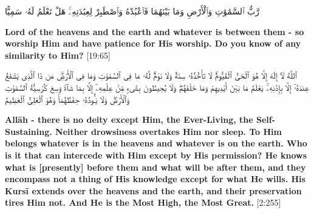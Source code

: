 \begin{center}
    \begin{RLtext}
        رَّبُّ ٱلسَّمَٰوَٰتِ وَٱلْأَرْضِ وَمَا بَيْنَهُمَا فَٱعْبُدْهُ وَٱصْطَبِرْ لِعِبَٰدَتِهِۦۚ هَلْ تَعْلَمُ لَهُۥ سَمِيًّا 
    \end{RLtext}
    \textbf{Lord of the heavens and the earth and whatever is between them - so worship Him and have patience for His worship. Do you know of any similarity to Him?} [19:65]
\end{center}
\begin{center}
    \begin{RLtext}
        ٱللَّهُ لَآ إِلَٰهَ إِلَّا هُوَ ٱلْحَىُّ ٱلْقَيُّومُۚ لَا تَأْخُذُهُۥ سِنَةٌ وَلَا نَوْمٌۚ لَّهُۥ مَا فِى ٱلسَّمَٰوَٰتِ وَمَا فِى ٱلْأَرْضِۗ مَن ذَا ٱلَّذِى يَشْفَعُ عِندَهُۥٓ إِلَّا بِإِذْنِهِۦۚ يَعْلَمُ مَا بَيْنَ أَيْدِيهِمْ وَمَا خَلْفَهُمْۖ وَلَا يُحِيطُونَ بِشَىْءٍ مِّنْ عِلْمِهِۦٓ إِلَّا بِمَا شَآءَۚ وَسِعَ كُرْسِيُّهُ ٱلسَّمَٰوَٰتِ وَٱلْأَرْضَۖ وَلَا يَـُٔودُهُۥ حِفْظُهُمَاۚ وَهُوَ ٱلْعَلِىُّ ٱلْعَظِيمُ 
    \end{RLtext}
\end{center}
\textbf{
    Allāh - there is no deity except Him, the Ever-Living, the Self-Sustaining. Neither drowsiness overtakes Him nor sleep. To Him belongs whatever is in the heavens and whatever is on the earth. Who is it that can intercede with Him except by His permission? He knows what is [presently] before them and what will be after them, and they encompass not a thing of His knowledge except for what He wills. His Kursī extends over the heavens and the earth, and their preservation tires Him not. And He is the Most High, the Most Great.} [2:255]

